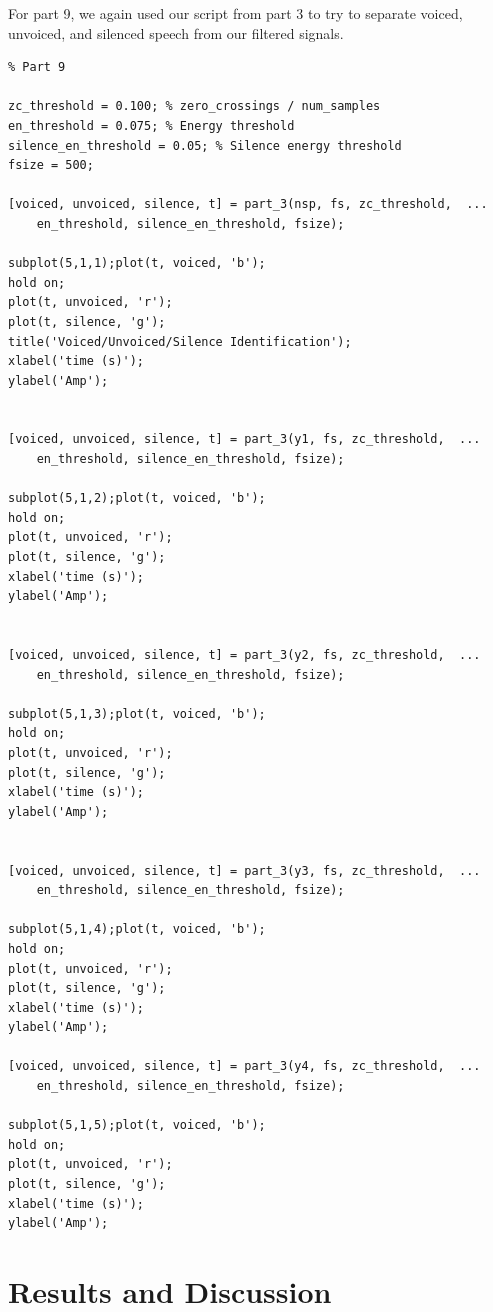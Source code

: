 \documentclass[11pt]{article}
\begin{document}
For part 9, we again used our script from part 3 to try to separate voiced, unvoiced, and silenced speech from our filtered signals.
\begin{lstlisting}
% Part 9

zc_threshold = 0.100; % zero_crossings / num_samples
en_threshold = 0.075; % Energy threshold
silence_en_threshold = 0.05; % Silence energy threshold
fsize = 500;

[voiced, unvoiced, silence, t] = part_3(nsp, fs, zc_threshold,  ...
    en_threshold, silence_en_threshold, fsize);

subplot(5,1,1);plot(t, voiced, 'b');
hold on;
plot(t, unvoiced, 'r');
plot(t, silence, 'g');
title('Voiced/Unvoiced/Silence Identification');
xlabel('time (s)');
ylabel('Amp');


[voiced, unvoiced, silence, t] = part_3(y1, fs, zc_threshold,  ...
    en_threshold, silence_en_threshold, fsize);

subplot(5,1,2);plot(t, voiced, 'b');
hold on;
plot(t, unvoiced, 'r');
plot(t, silence, 'g');
xlabel('time (s)');
ylabel('Amp');


[voiced, unvoiced, silence, t] = part_3(y2, fs, zc_threshold,  ...
    en_threshold, silence_en_threshold, fsize);

subplot(5,1,3);plot(t, voiced, 'b');
hold on;
plot(t, unvoiced, 'r');
plot(t, silence, 'g');
xlabel('time (s)');
ylabel('Amp');


[voiced, unvoiced, silence, t] = part_3(y3, fs, zc_threshold,  ...
    en_threshold, silence_en_threshold, fsize);

subplot(5,1,4);plot(t, voiced, 'b');
hold on;
plot(t, unvoiced, 'r');
plot(t, silence, 'g');
xlabel('time (s)');
ylabel('Amp');

[voiced, unvoiced, silence, t] = part_3(y4, fs, zc_threshold,  ...
    en_threshold, silence_en_threshold, fsize);

subplot(5,1,5);plot(t, voiced, 'b');
hold on;
plot(t, unvoiced, 'r');
plot(t, silence, 'g');
xlabel('time (s)');
ylabel('Amp');
\end{lstlisting}

%
%
%
%
%
%
\section{Results and Discussion}
\end{document}
